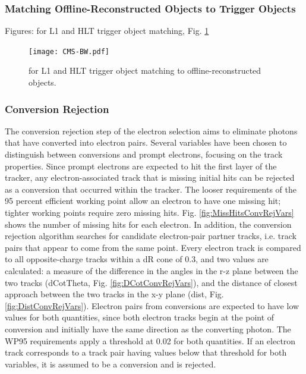 \subsubsection{Matching Offline-Reconstructed Objects to Trigger Objects}
Figures: \DR for L1 and HLT trigger object matching, Fig. \ref{fig:TriggerObjectSelectionDeltaR}

 \begin{figure}[htb]
  \begin{center}
    \texttt{[image: CMS-BW.pdf]}
  \end{center}
  \caption[\DR for L1 and HLT trigger object matching to offline for electron selection]{\DR for L1 and HLT trigger object matching to offline-reconstructed objects.}
  \label{fig:TriggerObjectSelectionDeltaR}
 \end{figure}


\subsubsection{Conversion Rejection}
The conversion rejection step of the electron selection aims to eliminate photons that have converted into electron pairs.  
Several variables have been chosen to distinguish between conversions and prompt electrons, focusing on the track properties.  
Since prompt electrons are expected to hit the first layer of the tracker, 
any electron-associated track that is missing initial hits can be rejected as a conversion that occurred within the tracker.  
The looser requirements of the 95 percent efficient working point allow an electron to have one missing hit;
tighter working points require zero missing hits.  
Fig. \ref{fig:MissHitsConvRejVars} shows the number of missing hits for each electron.  
In addition, the conversion rejection algorithm searches for candidate electron-pair partner tracks, 
i.e. track pairs that appear to come from the same point.  
Every electron track is compared to all opposite-charge tracks within a dR cone of 0.3, and two values are calculated: 
a measure of the difference in the angles in the r-z plane between the two tracks (dCotTheta, Fig. \ref{fig:DCotConvRejVars}), 
and the distance of closest approach between the two tracks in the x-y plane (dist, Fig. \ref{fig:DistConvRejVars}).  
Electron pairs from conversions are expected to have low values for both quantities, 
since both electron tracks begin at the point of conversion and initially have the same direction as the converting photon.  
The WP95 requirements apply a threshold at 0.02 for both quantities.  
If an electron track corresponds to a track pair having values below that threshold for both variables, 
it is assumed to be a conversion and is rejected.  

